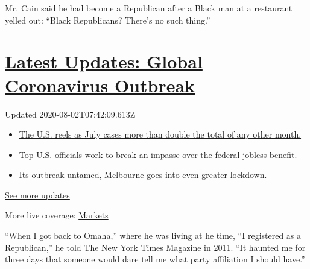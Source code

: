 Mr. Cain said he had become a Republican after a Black man at a
restaurant yelled out: ``Black Republicans? There's no such thing.''

\hypertarget{latest-updates-global-coronavirus-outbreak}{%
\section{\texorpdfstring{\href{https://www.nytimes.com/2020/08/01/world/coronavirus-covid-19.html?action=click\&pgtype=Article\&state=default\&region=MAIN_CONTENT_1\&context=storylines_live_updates}{Latest
Updates: Global Coronavirus
Outbreak}}{Latest Updates: Global Coronavirus Outbreak}}\label{latest-updates-global-coronavirus-outbreak}}

Updated 2020-08-02T07:42:09.613Z

\begin{itemize}
\tightlist
\item
  \href{https://www.nytimes.com/2020/08/01/world/coronavirus-covid-19.html?action=click\&pgtype=Article\&state=default\&region=MAIN_CONTENT_1\&context=storylines_live_updates\#link-34047410}{The
  U.S. reels as July cases more than double the total of any other
  month.}
\item
  \href{https://www.nytimes.com/2020/08/01/world/coronavirus-covid-19.html?action=click\&pgtype=Article\&state=default\&region=MAIN_CONTENT_1\&context=storylines_live_updates\#link-780ec966}{Top
  U.S. officials work to break an impasse over the federal jobless
  benefit.}
\item
  \href{https://www.nytimes.com/2020/08/01/world/coronavirus-covid-19.html?action=click\&pgtype=Article\&state=default\&region=MAIN_CONTENT_1\&context=storylines_live_updates\#link-2bc8948}{Its
  outbreak untamed, Melbourne goes into even greater lockdown.}
\end{itemize}

\href{https://www.nytimes.com/2020/08/01/world/coronavirus-covid-19.html?action=click\&pgtype=Article\&state=default\&region=MAIN_CONTENT_1\&context=storylines_live_updates}{See
more updates}

More live coverage:
\href{https://www.nytimes.com/live/2020/07/31/business/stock-market-today-coronavirus?action=click\&pgtype=Article\&state=default\&region=MAIN_CONTENT_1\&context=storylines_live_updates}{Markets}

``When I got back to Omaha,'' where he was living at he time, ``I
registered as a Republican,''
\href{https://www.nytimes.com/2011/07/03/magazine/herman-cain-talks-about-herman-cain.html}{he
told The New York Times Magazine} in 2011. ``It haunted me for three
days that someone would dare tell me what party affiliation I should
have.''

